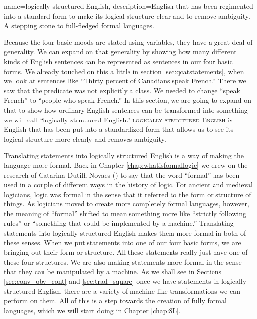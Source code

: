 {
name=logically structured English,
description={English that has been regimented into a standard form to make its logical structure clear and to remove ambiguity. A stepping stone to full-fledged formal languages.}
}

Because the four basic moods are stated using variables, they have a great deal of generality. We can expand on that generality by showing how many different kinds of English sentences can be represented as sentences in our four basic forms. We already touched on this a little in section \ref{sec:qcatstatements}, when we look at sentences like ``Thirty percent of Canadians speak French.'' There we saw that the predicate was not explicitly a class. We needed to change ``speak French'' to ``people who speak French.'' In this section, we are going to expand on that to show how ordinary English sentences can be transformed into something we will call ``logically structured English.'' \textsc{\gls{logically structured English}} \label{def:LSE} is English that has been put into a standardized form that allows us to see its logical structure more clearly and removes ambiguity.  

Translating statements into logically structured English is a way of making the language more formal. Back in Chapter \ref{chap:whatisformallogic} we drew on the research of Catarina Dutilh Novaes (\cite{DutilhNovaes2011}) to say that the word ``formal'' has been used in a couple of different ways in the history of logic. For ancient and medieval logicians, logic was formal in the sense that it referred to the form or structure of things. As logicians moved to create more completely formal languages, however, the meaning of ``formal'' shifted to mean something more like ``strictly following rules'' or ``something that could be implemented by a machine.'' Translating statements into logically structured English makes them more formal in both of these senses. When we put statements into one of our four basic forms, we are bringing out their form or structure. All these statements really just have one of these four structures. We are also making statements more formal in the sense that they can be manipulated by a machine. As we shall see in Sections \ref{sec:conv_obv_cont} and \ref{sec:trad_square} once we have statements in logically structured English, there are a variety of machine-like transformations we can perform on them. All of this is a step towards the creation of fully formal languages, which we will start doing in Chapter \ref{chap:SL}. 

